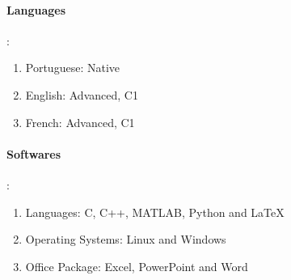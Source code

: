 \documentclass[10pt, a4paper]{article}
\begin{document}
\begin{multicols}{2}
    \paragraph{Languages}:
    \begin{enumerate}
        \item Portuguese: Native
        \item English: Advanced, C1
        \item French: Advanced, C1
    \end{enumerate}
    \columnbreak
    \paragraph{Softwares}:
    \begin{enumerate}
        \item Languages: C, C++, MATLAB, Python and LaTeX
        \item Operating Systems: Linux and Windows
        \item Office Package: Excel, PowerPoint and Word
    \end{enumerate}
\end{multicols}

\spacedhrule{1.6em}{-0.4em}
\end{document}
